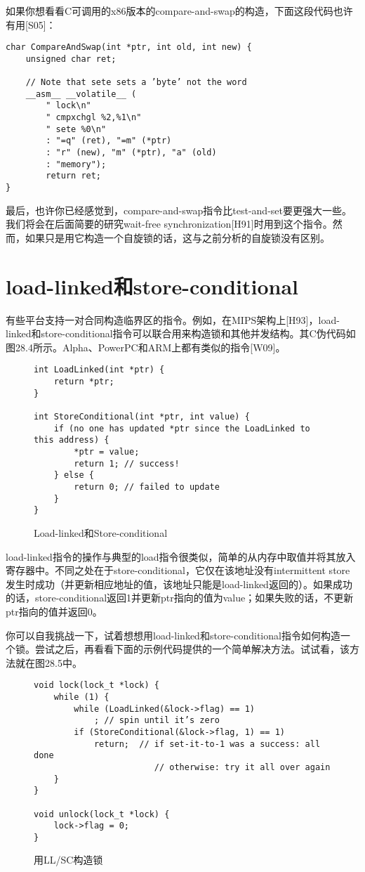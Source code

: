 如果你想看看C可调用的x86版本的compare-and-swap的构造，下面这段代码也许有用[S05]：

\begin{lstlisting}
char CompareAndSwap(int *ptr, int old, int new) {
    unsigned char ret;

    // Note that sete sets a ’byte’ not the word
    __asm__ __volatile__ (
        " lock\n"
        " cmpxchgl %2,%1\n"
        " sete %0\n"
        : "=q" (ret), "=m" (*ptr)
        : "r" (new), "m" (*ptr), "a" (old)
        : "memory");
        return ret;
}
\end{lstlisting}

最后，也许你已经感觉到，compare-and-swap指令比test-and-set要更强大一些。我们将会在后面简要的研究wait-free synchronization[H91]时用到这个指令。然而，如果只是用它构造一个自旋锁的话，这与之前分析的自旋锁没有区别。


\section{load-linked和store-conditional}

有些平台支持一对合同构造临界区的指令。例如，在MIPS架构上[H93]，load-linked和store-conditional指令可以联合用来构造锁和其他并发结构。其C伪代码如图28.4所示。Alpha、PowerPC和ARM上都有类似的指令[W09]。

\begin{figure}[h]
\begin{lstlisting}
int LoadLinked(int *ptr) {
    return *ptr;
}

int StoreConditional(int *ptr, int value) {
    if (no one has updated *ptr since the LoadLinked to this address) {
        *ptr = value;
        return 1; // success!
    } else {
        return 0; // failed to update
    }
}
\end{lstlisting}
\caption{Load-linked和Store-conditional}
\end{figure}

load-linked指令的操作与典型的load指令很类似，简单的从内存中取值并将其放入寄存器中。不同之处在于store-conditional，它仅在该地址没有intermittent store发生时成功（并更新相应地址的值，该地址只能是load-linked返回的）。如果成功的话，store-conditional返回1并更新ptr指向的值为value；如果失败的话，不更新ptr指向的值并返回0。

你可以自我挑战一下，试着想想用load-linked和store-conditional指令如何构造一个锁。尝试之后，再看看下面的示例代码提供的一个简单解决方法。试试看，该方法就在图28.5中。

\begin{figure}[ht]
\begin{lstlisting}
void lock(lock_t *lock) {
    while (1) {
        while (LoadLinked(&lock->flag) == 1)
            ; // spin until it’s zero
        if (StoreConditional(&lock->flag, 1) == 1)
            return;  // if set-it-to-1 was a success: all done
                        // otherwise: try it all over again
    }
}

void unlock(lock_t *lock) {
    lock->flag = 0;
}
\end{lstlisting}
\caption{用LL/SC构造锁}
\end{figure}

